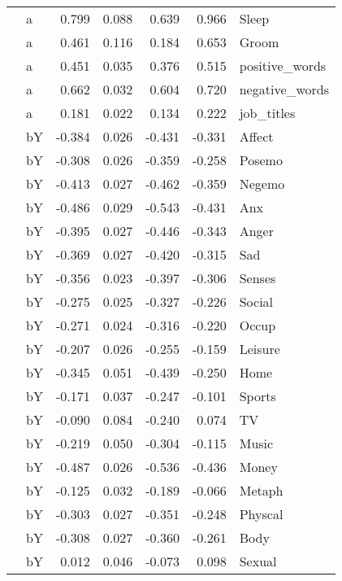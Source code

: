 \documentclass[11pt,a4paper]{article}
\begin{document}
\begin{longtable}{llrrrrl}
   & a &  0.799 &  0.088 &    0.639 &     0.966 &           Sleep \\
   & a &  0.461 &  0.116 &    0.184 &     0.653 &           Groom \\
   & a &  0.451 &  0.035 &    0.376 &     0.515 &  positive\_words \\
   & a &  0.662 &  0.032 &    0.604 &     0.720 &  negative\_words \\
   & a &  0.181 &  0.022 &    0.134 &     0.222 &      job\_titles \\
   & bY & -0.384 &  0.026 &   -0.431 &    -0.331 &          Affect \\
   & bY & -0.308 &  0.026 &   -0.359 &    -0.258 &          Posemo \\
   & bY & -0.413 &  0.027 &   -0.462 &    -0.359 &          Negemo \\
   & bY & -0.486 &  0.029 &   -0.543 &    -0.431 &             Anx \\
   & bY & -0.395 &  0.027 &   -0.446 &    -0.343 &           Anger \\
   & bY & -0.369 &  0.027 &   -0.420 &    -0.315 &             Sad \\
   & bY & -0.356 &  0.023 &   -0.397 &    -0.306 &          Senses \\
   & bY & -0.275 &  0.025 &   -0.327 &    -0.226 &          Social \\
   & bY & -0.271 &  0.024 &   -0.316 &    -0.220 &           Occup \\
   & bY & -0.207 &  0.026 &   -0.255 &    -0.159 &         Leisure \\
   & bY & -0.345 &  0.051 &   -0.439 &    -0.250 &            Home \\
   & bY & -0.171 &  0.037 &   -0.247 &    -0.101 &          Sports \\
   & bY & -0.090 &  0.084 &   -0.240 &     0.074 &              TV \\
   & bY & -0.219 &  0.050 &   -0.304 &    -0.115 &           Music \\
   & bY & -0.487 &  0.026 &   -0.536 &    -0.436 &           Money \\
   & bY & -0.125 &  0.032 &   -0.189 &    -0.066 &          Metaph \\
   & bY & -0.303 &  0.027 &   -0.351 &    -0.248 &         Physcal \\
   & bY & -0.308 &  0.027 &   -0.360 &    -0.261 &            Body \\
   & bY &  0.012 &  0.046 &   -0.073 &     0.098 &          Sexual \\

\end{longtable}
\end{document}
